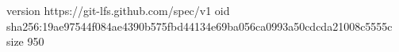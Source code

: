 version https://git-lfs.github.com/spec/v1
oid sha256:19ae97544f084ae4390b575fbd44134e69ba056ca0993a50cdcda21008c5555c
size 950

